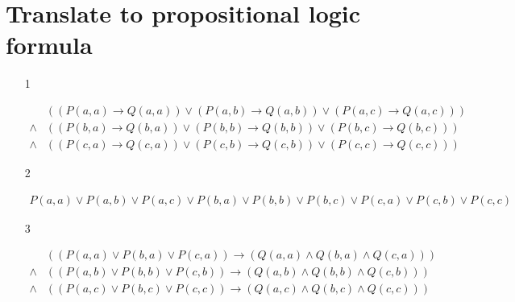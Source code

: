 \documentclass{article}
\begin{document}
\section{Translate to propositional logic formula}

\begin{itemize}
    \item [1] 

        $$
        \begin{aligned}
            &((P(a,a)\to Q(a,a))\lor(P(a,b)\to Q(a,b))\lor(P(a,c)\to Q(a,c)))\\
            \land&((P(b,a)\to Q(b,a))\lor(P(b,b)\to Q(b,b))\lor(P(b,c)\to Q(b,c)))\\
            \land&((P(c,a)\to Q(c,a))\lor(P(c,b)\to Q(c,b))\lor(P(c,c)\to Q(c,c)))
        \end{aligned}
        $$

    \item [2]
    
        $$
        \begin{aligned}
            P(a,a)\lor P(a,b)\lor P(a,c)\lor P(b,a)\lor P(b,b)\lor P(b,c)\lor P(c,a)\lor P(c,b)\lor P(c,c)
        \end{aligned}
        $$

    \item [3]
    
        $$
        \begin{aligned}
            &((P(a,a)\lor P(b,a)\lor P(c,a))\to(Q(a,a)\land Q(b,a)\land Q(c,a)))\\
            \land&((P(a,b)\lor P(b,b)\lor P(c,b))\to(Q(a,b)\land Q(b,b)\land Q(c,b)))\\
            \land&((P(a,c)\lor P(b,c)\lor P(c,c))\to(Q(a,c)\land Q(b,c)\land Q(c,c)))
        \end{aligned} 
        $$
\end{itemize}
\end{document}
